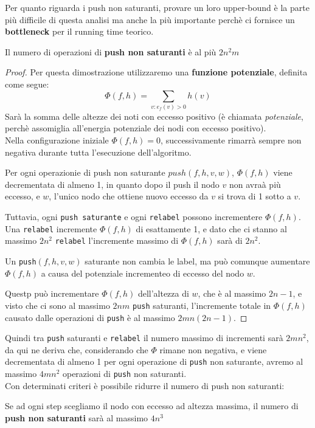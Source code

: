 Per quanto riguarda i push non saturanti, provare un loro upper-bound è la parte
più difficile di questa analisi ma anche la più importante perchè ci fornisce un
\textbf{bottleneck} per il running time teorico.

\begin{myblockquote}
	Il numero di operazioni di \textbf{push non saturanti} è al più $2n^2m$
\end{myblockquote}

\begin{proof}
	Per questa dimostrazione utilizzaremo una
	\textbf{funzione potenziale}, definita come segue:
	$$
		\Phi(f, h) = \sum_{v:e_f(v)>0}h(v)
	$$
	Sarà la somma delle altezze dei noti con eccesso positivo (è chiamata
	\textit{potenziale}, perchè assomiglia all'energia potenziale dei nodi con
	eccesso positivo).\\

	Nella configurazione iniziale $\Phi(f, h) = 0$, successivamente rimarrà sempre
	non negativa durante tutta l'esecuzione dell'algoritmo.

	Per ogni operazionie di push non saturante $push(f, h, v, w)$, $\Phi(f, h)$
	viene decrementata di almeno 1, in quanto dopo il push il nodo $v$ non avraà più
	eccesso, e $w$, l'unico nodo che ottiene nuovo eccesso da $v$ si trova di 1
	sotto a $v$.

	Tuttavia, ogni \texttt{push saturante} e ogni \texttt{relabel} possono
	incrementere $\Phi(f, h)$. Una \texttt{relabel} incremente $\Phi(f, h)$ di
	esattamente 1, e dato che ci stanno al massimo $2n^2$ \texttt{relabel}
	l'incremente massimo di $\Phi(f, h)$ sarà di $2n^2$.

	Un \texttt{push}$(f, h, v, w)$ saturante non cambia le label, ma può comunque
	aumentare $\Phi(f, h)$ a causa del potenziale incrementeo di eccesso del nodo
	$w$.

	Questp può incrementare $\Phi(f, h)$ dell'altezza di $w$, che è al massimo
	$2n-1$, e visto che ci sono al massimo $2nm$ \texttt{push} saturanti,
	l'incremente totale  in $\Phi(f, h)$ causato dalle operazioni di \texttt{push} è
	al massimo $2mn(2n-1)$.
\end{proof}

Quindi tra \texttt{push} saturanti e \texttt{relabel} il numero massimo di
incrementi sarà $2mn^2$, da qui ne deriva che, considerando che $\Phi$ rimane
non negativa, e viene decrementata di almeno 1 per ogni operazione di
\texttt{push} non saturante, avremo al massimo $4mn^2$ operazioni di
\texttt{push} non saturanti.\\

Con determinati criteri è possibile ridurre il numero di push non saturanti:

\begin{myblockquote}
	Se ad ogni step scegliamo il nodo con eccesso ad altezza massima, il numero
	di \textbf{push non saturanti} sarà al massimo $4n^3$
\end{myblockquote}
